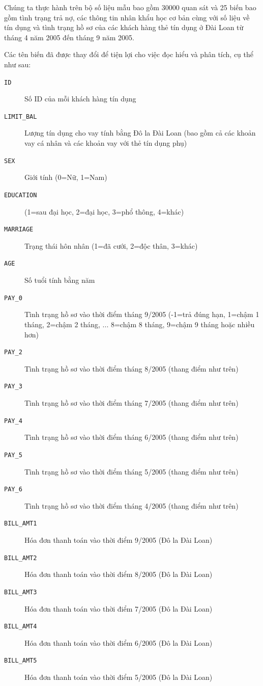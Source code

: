 \documentclass[a4paper]{report}\usepackage[]{graphicx}\usepackage[]{color}
\begin{document}
Chúng ta thực hành trên bộ số liệu mẫu bao gồm 30000 quan sát và 25 biến bao gồm tình trạng trả nợ, các thông tin nhân khẩu học cơ bản cùng với số liệu về tín dụng và tình trạng hồ sơ của các khách hàng thẻ tín dụng ở Đài Loan từ tháng 4 năm 2005 đến tháng 9 năm 2005.

Các tên biến đã được thay đổi để tiện lợi cho việc đọc hiểu và phân tích, cụ thể như sau:

\begin{description}
  \item [\texttt{ID}] Số ID của mỗi khách hàng tín dụng
  \item [\texttt{LIMIT\_BAL}] Lượng tín dụng cho vay tính bằng Đô la Đài Loan (bao gồm cả các khoản vay cá nhân và các khoản vay với thẻ tín dụng phụ)
  \item [\texttt{SEX}] Giới tính (0=Nữ, 1=Nam)
  \item [\texttt{EDUCATION}] (1=sau đại học, 2=đại học, 3=phổ thông, 4=khác)
  \item [\texttt{MARRIAGE}] Trạng thái hôn nhân (1=đã cưới, 2=độc thân, 3=khác)
  \item [\texttt{AGE}] Số tuổi tính bằng năm
  \item [\texttt{PAY\_0}] Tình trạng hồ sơ vào thời điểm tháng 9/2005 (-1=trả đúng hạn, 1=chậm 1 tháng, 2=chậm 2 tháng, ... 8=chậm 8 tháng, 9=chậm 9 tháng hoặc nhiều hơn)
  \item [\texttt{PAY\_2}] Tình trạng hồ sơ vào thời điểm tháng 8/2005 (thang điểm như trên)
  \item [\texttt{PAY\_3}] Tình trạng hồ sơ vào thời điểm tháng 7/2005 (thang điểm như trên)
  \item [\texttt{PAY\_4}] Tình trạng hồ sơ vào thời điểm tháng 6/2005 (thang điểm như trên)
  \item [\texttt{PAY\_5}] Tình trạng hồ sơ vào thời điểm tháng 5/2005 (thang điểm như trên)
  \item [\texttt{PAY\_6}] Tình trạng hồ sơ vào thời điểm tháng 4/2005 (thang điểm như trên)
  \item [\texttt{BILL\_AMT1}] Hóa đơn thanh toán vào thời điểm 9/2005 (Đô la Đài Loan)
  \item [\texttt{BILL\_AMT2}] Hóa đơn thanh toán vào thời điểm 8/2005 (Đô la Đài Loan)
  \item [\texttt{BILL\_AMT3}] Hóa đơn thanh toán vào thời điểm 7/2005 (Đô la Đài Loan)
  \item [\texttt{BILL\_AMT4}] Hóa đơn thanh toán vào thời điểm 6/2005 (Đô la Đài Loan)
  \item [\texttt{BILL\_AMT5}] Hóa đơn thanh toán vào thời điểm 5/2005 (Đô la Đài Loan)

\end{description}
\end{document}
